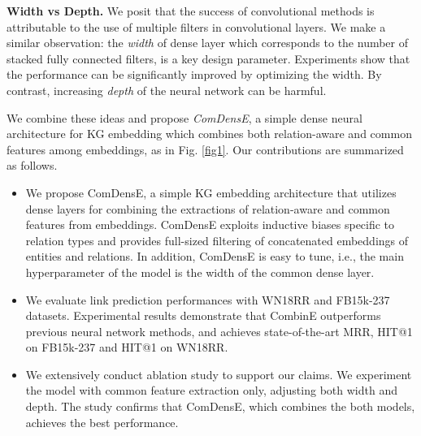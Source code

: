 \textbf{Width vs Depth.} We posit that the success of convolutional methods is attributable to the use of multiple filters in convolutional layers. We make a similar observation: the \emph{width} of dense layer which corresponds to the number of stacked fully connected filters, is a key design parameter. Experiments show that the performance can be significantly improved by optimizing the width. By contrast, increasing \emph{depth} of the neural network can be harmful.

We combine these ideas and propose \emph{ComDensE}, a simple dense neural architecture for KG embedding which combines both relation-aware and common features among embeddings, as in Fig. \ref{fig1}. Our contributions are summarized as follows.

\begin{itemize}
	\item We propose ComDensE, a simple KG embedding architecture that utilizes dense layers for combining the extractions of relation-aware and common features from embeddings. ComDensE exploits inductive biases specific to relation types and provides full-sized filtering of concatenated embeddings of entities and relations. In addition, ComDensE is easy to tune, i.e., the main hyperparameter of the model is the width of the common dense layer.

    \item We evaluate link prediction performances with WN18RR and FB15k-237 datasets. Experimental results demonstrate that CombinE outperforms previous neural network methods, and achieves state-of-the-art MRR, HIT@1 on FB15k-237 and HIT@1 on WN18RR.
    
    \item We extensively conduct ablation study to support our claims. We experiment the model with common feature extraction only, adjusting both width and depth. The study confirms that ComDensE, which combines the both models, achieves the best performance.
\end{itemize}